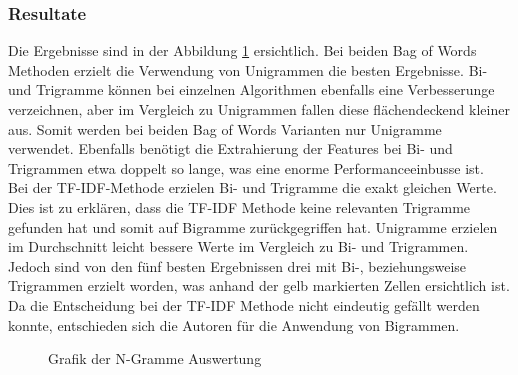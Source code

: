 \subsubsection{Resultate}
Die Ergebnisse sind in der Abbildung \cref{abb:ngram} ersichtlich.
Bei beiden \glqq Bag of Words\grqq{} Methoden erzielt die Verwendung von Unigrammen die besten Ergebnisse.
Bi- und Trigramme können bei einzelnen Algorithmen ebenfalls eine Verbesserunge verzeichnen, aber im Vergleich zu Unigrammen fallen diese flächendeckend kleiner aus.
Somit werden bei beiden \glqq Bag of Words\grqq{} Varianten nur Unigramme verwendet.
Ebenfalls benötigt die Extrahierung der Features bei Bi- und Trigrammen etwa doppelt so lange, was eine enorme Performanceeinbusse ist.\\
Bei der TF-IDF-Methode erzielen Bi- und Trigramme die exakt gleichen Werte.
Dies ist zu erklären, dass die TF-IDF Methode keine relevanten Trigramme gefunden hat und somit auf Bigramme zurückgegriffen hat.
Unigramme erzielen im Durchschnitt leicht bessere Werte im Vergleich zu Bi- und Trigrammen.
Jedoch sind von den fünf besten Ergebnissen drei mit Bi-, beziehungsweise Trigrammen erzielt worden, was anhand der gelb markierten Zellen ersichtlich ist.
Da die Entscheidung bei der TF-IDF Methode nicht eindeutig gefällt werden konnte, entschieden sich die Autoren für die Anwendung von Bigrammen.
\begin{figure}[H]	
	\setlength{\fboxsep}{0.3pt} 
	\setlength{\fboxrule}{0.3pt} 
	\caption{Grafik der N-Gramme Auswertung}
	\label{abb:ngram}
\end{figure}
